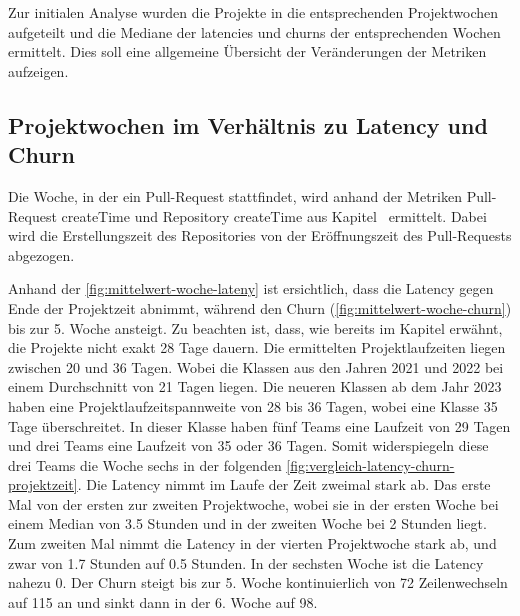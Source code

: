 Zur initialen Analyse wurden die Projekte in die entsprechenden Projektwochen aufgeteilt und die Mediane der latencies und churns der entsprechenden Wochen ermittelt. Dies soll eine allgemeine Übersicht der Veränderungen der Metriken aufzeigen.

\subsection{Projektwochen im Verhältnis zu Latency und Churn}
\label{sec:ProjektwochenLatencyChurn}
Die Woche, in der ein Pull-Request stattfindet, wird anhand der Metriken Pull-Request createTime und Repository createTime aus Kapitel~ ermittelt. Dabei wird die Erstellungszeit des Repositories von der Eröffnungszeit des Pull-Requests abgezogen.

Anhand der \autoref{fig:mittelwert-woche-lateny} ist ersichtlich, dass die Latency gegen Ende der Projektzeit abnimmt, während den Churn (\autoref{fig:mittelwert-woche-churn}) bis zur 5. Woche ansteigt. 
Zu beachten ist, dass, wie bereits im Kapitel  erwähnt, die Projekte nicht exakt 28 Tage dauern. Die ermittelten Projektlaufzeiten liegen zwischen 20 und 36 Tagen.
Wobei die Klassen aus den Jahren 2021 und 2022 bei einem Durchschnitt von 21 Tagen liegen. Die neueren Klassen ab dem Jahr 2023 haben eine Projektlaufzeitspannweite von 28 bis 36 Tagen, wobei eine Klasse 35 Tage überschreitet. In dieser Klasse haben fünf Teams eine Laufzeit von 29 Tagen und drei Teams eine Laufzeit von 35 oder 36 Tagen. Somit widerspiegeln diese drei Teams die Woche sechs in der folgenden \autoref{fig:vergleich-latency-churn-projektzeit}. Die Latency nimmt im Laufe der Zeit zweimal stark ab. Das erste Mal von der ersten zur zweiten Projektwoche, wobei sie in der ersten Woche bei einem Median von 3.5 Stunden und in der zweiten Woche bei 2 Stunden liegt. Zum zweiten Mal nimmt die Latency in der vierten Projektwoche stark ab, und zwar von 1.7 Stunden auf 0.5 Stunden. In der sechsten Woche ist die Latency nahezu 0. Der Churn steigt bis zur 5. Woche kontinuierlich von 72 Zeilenwechseln auf 115 an und sinkt dann in der 6. Woche auf 98.
